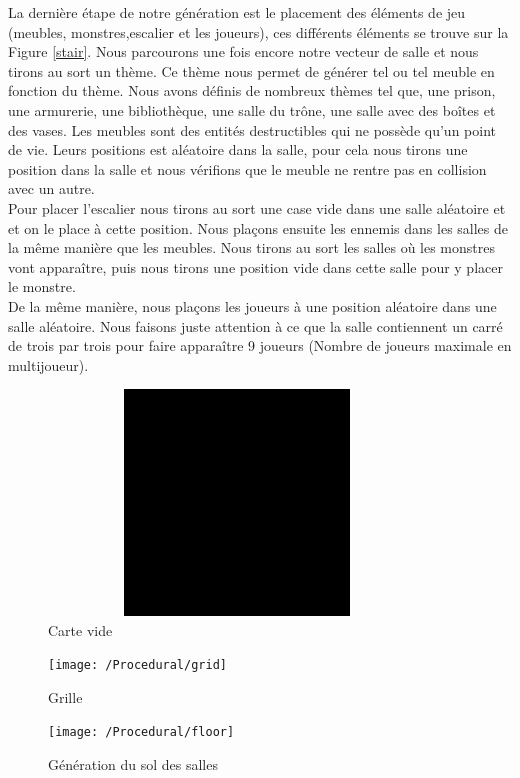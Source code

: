 \documentclass[a4paper, 12pt]{article}
\begin{document}
La dernière étape de notre génération est le placement des éléments de jeu (meubles, monstres,escalier et les joueurs), ces différents éléments se trouve sur la Figure \ref{stair}. Nous parcourons une fois encore notre vecteur de salle et nous tirons au sort un thème. Ce thème nous permet de générer tel ou tel meuble en fonction du thème. Nous avons définis de nombreux thèmes tel que, une prison, une armurerie, une bibliothèque, une salle du trône, une salle avec des boîtes et des vases. Les meubles sont des entités destructibles qui ne possède qu'un point de vie. Leurs positions est aléatoire dans la salle, pour cela nous tirons une position dans la salle et nous vérifions que le meuble ne rentre pas en collision avec un autre. \\
Pour placer l'escalier nous tirons au sort une case vide dans une salle aléatoire et et on le place à cette position.
Nous plaçons ensuite les ennemis dans les salles de la même manière que les meubles. Nous tirons au sort les salles où les monstres vont apparaître, puis nous tirons une position vide dans cette salle pour y placer le monstre. \\
De la même manière, nous plaçons les joueurs à une position aléatoire dans une salle aléatoire. Nous faisons juste attention à ce que la salle contiennent un carré de trois par trois pour faire apparaître 9 joueurs (Nombre de joueurs maximale en multijoueur). \\
\begin{figure}
\center
\includegraphics[width=10cm,height=6cm]{./Procedural/void}
\caption{Carte vide}
\label{vide}
\end{figure}

\begin{figure}
\center
\texttt{[image: /Procedural/grid]}
\caption{Grille}
\label{grid}
\end{figure}

\begin{figure}
\center
\texttt{[image: /Procedural/floor]}
\caption{Génération du sol des salles}
\label{floor}
\end{figure}
\end{document}
